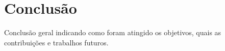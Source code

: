 \section{Conclusão}

Conclusão geral indicando como foram atingido os objetivos, quais as contribuições e trabalhos futuros.

